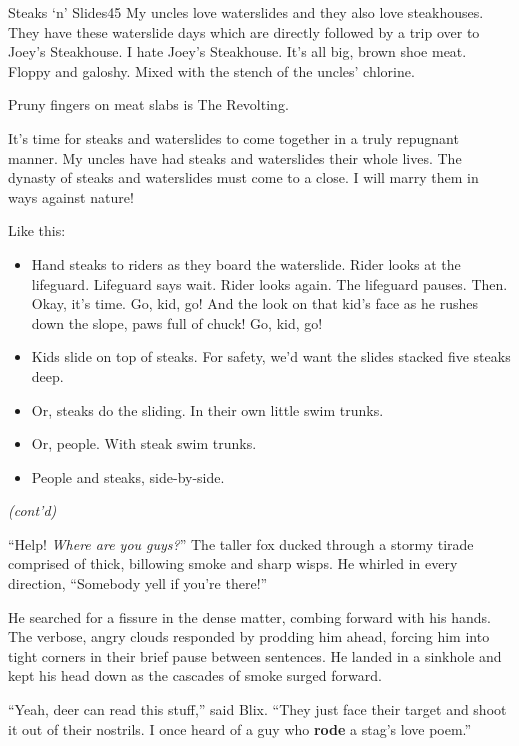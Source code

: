 \documentclass[12pt,twoside]{report}
\begin{document}
	\begin{sidebar}{Steaks `n' Slides}{45}
		My uncles love waterslides and they also love steakhouses. They have these waterslide days which are directly followed by a trip over to Joey's Steakhouse. I hate Joey's Steakhouse. It's all big, brown shoe meat. Floppy and galoshy. Mixed with the stench of the uncles' chlorine.\vspace{6pt}
		
		Pruny fingers on meat slabs is The Revolting.\vspace{6pt}

		It's time for steaks and waterslides to come together in a truly repugnant manner. My uncles have had steaks and waterslides their whole lives. The dynasty of steaks and waterslides must come to a close. I will marry them in ways against nature!\vspace{6pt}
		
		Like this:
		\begin{itemize}
			\item Hand steaks to riders as they board the waterslide. Rider looks at the lifeguard. Lifeguard says wait. Rider looks again. The lifeguard pauses. Then. Okay, it's time. Go, kid, go! And the look on that kid's face as he rushes down the slope, paws full of chuck! Go, kid, go!
			\item Kids slide on top of steaks. For safety, we'd want the slides stacked five steaks deep.
			\item Or, steaks do the sliding. In their own little swim trunks.
			\item Or, people. With steak swim trunks.
			\item People and steaks, side-by-side.
		\end{itemize}
		\textit{(cont'd)}
	\end{sidebar}

``Help!  {\em Where are you guys?}''  The taller fox ducked through a
stormy tirade comprised of thick, billowing smoke and sharp wisps.  He
whirled in every direction, ``Somebody yell if you're there!''

He searched for a fissure in the dense matter, combing forward with
his hands.  The verbose, angry clouds responded by prodding him ahead,
forcing him into tight corners in their brief pause between sentences.
He landed in a sinkhole and kept his head down as the cascades of
smoke surged forward.

``Yeah, deer can read this stuff,'' said Blix.  ``They just face their
target and shoot it out of their nostrils.  I once heard of a guy who
{\bf rode} a stag's love poem.''
\end{document}
